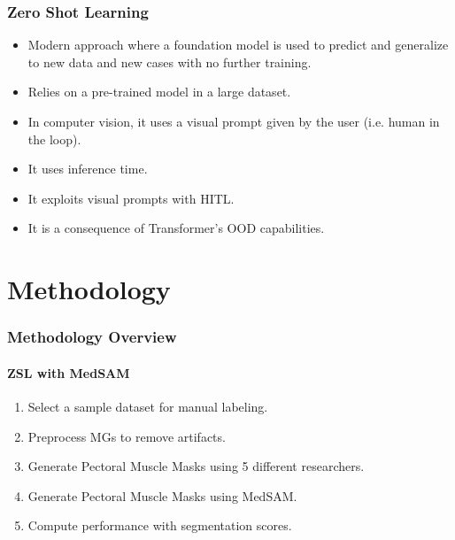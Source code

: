 \documentclass{beamer}
\begin{document}
\begin{frame}
  \frametitle{Zero Shot Learning}

      \begin{itemize}

      \item Modern approach where a foundation model
        is used to predict and generalize to new data and new cases
        with no further training.
      \item Relies on a pre-trained model in a large dataset.
      \item In computer vision, it uses a visual prompt given by the
        user (i.e. human in the loop).
      \item It uses inference time.
      \item It exploits visual prompts with \ac{HITL}.
      \item It is a consequence of Transformer's \ac{OOD} capabilities.

      \end{itemize}



\end{frame}






\section{Methodology}

\begin{frame}
  \frametitle{Methodology Overview}
  \framesubtitle{ZSL with \ac{MedSAM}}

          \begin{enumerate}
  \item Select a sample dataset for manual labeling.
  \item Preprocess \ac{MG}s to remove artifacts.
  \item Generate Pectoral Muscle Masks using 5 different researchers.
  \item Generate Pectoral Muscle Masks using \ac{MedSAM}.
  \item Compute performance with segmentation scores.
  \end{enumerate}  
        
\end{frame}
\end{document}
